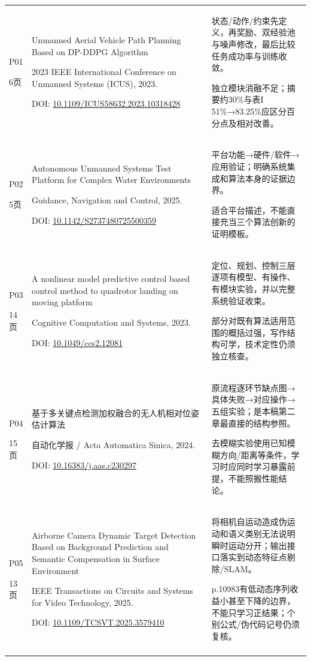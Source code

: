 \begin{longtable}{@{}>{\raggedright\arraybackslash}p{1cm}>{\raggedright\arraybackslash}p{7.0cm}>{\raggedright\arraybackslash}p{7.4cm}@{}}
P01\par 6页 & Unmanned Aerial Vehicle Path Planning Based on DP-DDPG Algorithm\par 2023 IEEE International Conference on Unmanned Systems (ICUS), 2023. \par DOI: \url{10.1109/ICUS58632.2023.10318428} & 状态/动作/约束先定义，再奖励、双经验池与噪声修改，最后比较任务成功率与训练收敛。\par 独立模块消融不足；摘要约30\%与表I 51\%→83.25\%应区分百分点及相对改善。 \\\addlinespace[5pt]
P02\par 5页 & Autonomous Unmanned Systems Test Platform for Complex Water Environments\par Guidance, Navigation and Control, 2025. \par DOI: \url{10.1142/S2737480725500359} & 平台功能→硬件/软件→应用验证；明确系统集成和算法本身的证据边界。\par 适合平台描述，不能直接充当三个算法创新的证明模板。 \\\addlinespace[5pt]
P03\par 14页 & A nonlinear model predictive control based control method to quadrotor landing on moving platform\par Cognitive Computation and Systems, 2023. \par DOI: \url{10.1049/ccs2.12081} & 定位、规划、控制三层逐项有模型、有操作、有模块实验，并以完整系统验证收束。\par 部分对既有算法适用范围的概括过强，写作结构可学，技术定性仍须独立核查。 \\\addlinespace[5pt]
P04\par 15页 & 基于多关键点检测加权融合的无人机相对位姿估计算法\par 自动化学报 / Acta Automatica Sinica, 2024. \par DOI: \url{10.16383/j.aas.c230297} & 原流程逐环节缺点图→具体失败→对应操作→五组实验；是本稿第二章最直接的结构参照。\par 去模糊实验使用已知模糊方向/距离等条件，学习时应同时学习暴露前提，不能照搬性能结论。 \\\addlinespace[5pt]
P05\par 13页 & Airborne Camera Dynamic Target Detection Based on Background Prediction and Semantic Compensation in Surface Environment\par IEEE Transactions on Circuits and Systems for Video Technology, 2025. \par DOI: \url{10.1109/TCSVT.2025.3579410} & 将相机自运动造成伪运动和语义类别无法说明瞬时运动分开；输出接口落实到动态特征点剔除/SLAM。\par p.10983有低动态序列收益小甚至下降的边界，不能只学习正结果；个别公式/伪代码记号仍须复核。 \\\addlinespace[5pt]

\end{longtable}
